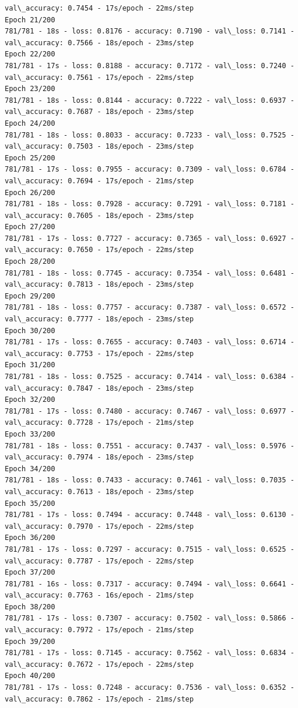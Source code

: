 \documentclass[11pt]{article}
\begin{document}
\begin{Verbatim}[commandchars=\\\{\}]
val\_accuracy: 0.7454 - 17s/epoch - 22ms/step
Epoch 21/200
781/781 - 18s - loss: 0.8176 - accuracy: 0.7190 - val\_loss: 0.7141 -
val\_accuracy: 0.7566 - 18s/epoch - 23ms/step
Epoch 22/200
781/781 - 17s - loss: 0.8188 - accuracy: 0.7172 - val\_loss: 0.7240 -
val\_accuracy: 0.7561 - 17s/epoch - 22ms/step
Epoch 23/200
781/781 - 18s - loss: 0.8144 - accuracy: 0.7222 - val\_loss: 0.6937 -
val\_accuracy: 0.7687 - 18s/epoch - 23ms/step
Epoch 24/200
781/781 - 18s - loss: 0.8033 - accuracy: 0.7233 - val\_loss: 0.7525 -
val\_accuracy: 0.7503 - 18s/epoch - 23ms/step
Epoch 25/200
781/781 - 17s - loss: 0.7955 - accuracy: 0.7309 - val\_loss: 0.6784 -
val\_accuracy: 0.7694 - 17s/epoch - 21ms/step
Epoch 26/200
781/781 - 18s - loss: 0.7928 - accuracy: 0.7291 - val\_loss: 0.7181 -
val\_accuracy: 0.7605 - 18s/epoch - 23ms/step
Epoch 27/200
781/781 - 17s - loss: 0.7727 - accuracy: 0.7365 - val\_loss: 0.6927 -
val\_accuracy: 0.7650 - 17s/epoch - 22ms/step
Epoch 28/200
781/781 - 18s - loss: 0.7745 - accuracy: 0.7354 - val\_loss: 0.6481 -
val\_accuracy: 0.7813 - 18s/epoch - 23ms/step
Epoch 29/200
781/781 - 18s - loss: 0.7757 - accuracy: 0.7387 - val\_loss: 0.6572 -
val\_accuracy: 0.7777 - 18s/epoch - 23ms/step
Epoch 30/200
781/781 - 17s - loss: 0.7655 - accuracy: 0.7403 - val\_loss: 0.6714 -
val\_accuracy: 0.7753 - 17s/epoch - 22ms/step
Epoch 31/200
781/781 - 18s - loss: 0.7525 - accuracy: 0.7414 - val\_loss: 0.6384 -
val\_accuracy: 0.7847 - 18s/epoch - 23ms/step
Epoch 32/200
781/781 - 17s - loss: 0.7480 - accuracy: 0.7467 - val\_loss: 0.6977 -
val\_accuracy: 0.7728 - 17s/epoch - 21ms/step
Epoch 33/200
781/781 - 18s - loss: 0.7551 - accuracy: 0.7437 - val\_loss: 0.5976 -
val\_accuracy: 0.7974 - 18s/epoch - 23ms/step
Epoch 34/200
781/781 - 18s - loss: 0.7433 - accuracy: 0.7461 - val\_loss: 0.7035 -
val\_accuracy: 0.7613 - 18s/epoch - 23ms/step
Epoch 35/200
781/781 - 17s - loss: 0.7494 - accuracy: 0.7448 - val\_loss: 0.6130 -
val\_accuracy: 0.7970 - 17s/epoch - 22ms/step
Epoch 36/200
781/781 - 17s - loss: 0.7297 - accuracy: 0.7515 - val\_loss: 0.6525 -
val\_accuracy: 0.7787 - 17s/epoch - 22ms/step
Epoch 37/200
781/781 - 16s - loss: 0.7317 - accuracy: 0.7494 - val\_loss: 0.6641 -
val\_accuracy: 0.7763 - 16s/epoch - 21ms/step
Epoch 38/200
781/781 - 17s - loss: 0.7307 - accuracy: 0.7502 - val\_loss: 0.5866 -
val\_accuracy: 0.7972 - 17s/epoch - 21ms/step
Epoch 39/200
781/781 - 17s - loss: 0.7145 - accuracy: 0.7562 - val\_loss: 0.6834 -
val\_accuracy: 0.7672 - 17s/epoch - 22ms/step
Epoch 40/200
781/781 - 17s - loss: 0.7248 - accuracy: 0.7536 - val\_loss: 0.6352 -
val\_accuracy: 0.7862 - 17s/epoch - 21ms/step

\end{Verbatim}
\end{document}
